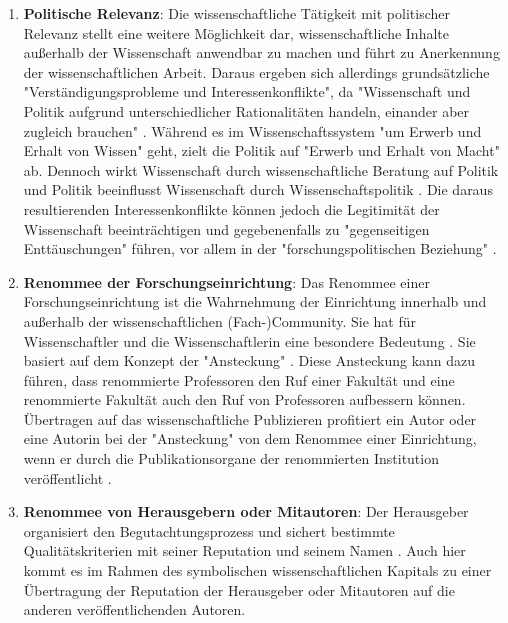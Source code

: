 \begin{enumerate}
\item \textbf{Politische Relevanz}: Die wissenschaftliche Tätigkeit mit politischer Relevanz stellt eine weitere Möglichkeit dar, wissenschaftliche Inhalte außerhalb der Wissenschaft anwendbar zu machen und führt zu Anerkennung der wissenschaftlichen Arbeit. Daraus ergeben sich allerdings grundsätzliche "Verständigungsprobleme und Interessenkonflikte", da  "Wissenschaft und Politik aufgrund unterschiedlicher Rationalitäten handeln, einander aber zugleich brauchen" \cite{Mayntz_1996}. Während es im Wissenschaftssystem "um Erwerb und Erhalt von Wissen" geht, zielt die Politik auf "Erwerb und Erhalt von Macht" \cite{Mayntz_1996} ab. Dennoch wirkt Wissenschaft durch wissenschaftliche Beratung auf Politik und  Politik beeinflusst Wissenschaft durch Wissenschaftspolitik \cite[:10]{Brown_2014}. Die daraus resultierenden Interessenkonflikte können jedoch die Legitimität der Wissenschaft beeinträchtigen \cite{Weingart_2005} \cite[:494]{Weber_2002} und gegebenenfalls zu "gegenseitigen Enttäuschungen" führen, vor allem in der "forschungspolitischen Beziehung" \cite{Mayntz_1996}.
\item \textbf{Renommee der Forschungseinrichtung}: Das Renommee einer Forschungseinrichtung ist die Wahrnehmung der Einrichtung innerhalb und außerhalb der wissenschaftlichen (Fach-)Community. Sie hat für Wissenschaftler und die Wissenschaftlerin eine besondere Bedeutung \cite{Mayntz_2008}. Sie basiert auf dem Konzept der "Ansteckung" \cite{Luhmann_1970}. Diese Ansteckung kann dazu führen, dass renommierte Professoren den Ruf einer Fakultät und eine renommierte Fakultät auch den Ruf von Professoren aufbessern können. Übertragen auf das wissenschaftliche Publizieren profitiert ein Autor oder eine Autorin bei der "Ansteckung" von dem Renommee einer Einrichtung, wenn er durch die Publikationsorgane der renommierten Institution veröffentlicht \cite{Lutz_2012} \cite{Buss_2001}.
\item \textbf{Renommee von Herausgebern oder Mitautoren}: Der Herausgeber organisiert den Begutachtungsprozess und sichert bestimmte Qualitätskriterien mit seiner Reputation und seinem Namen \cite{Mueller_2009}. Auch hier kommt es im Rahmen des symbolischen wissenschaftlichen Kapitals zu einer Übertragung der Reputation der Herausgeber oder Mitautoren auf die anderen veröffentlichenden Autoren.

\end{enumerate}

